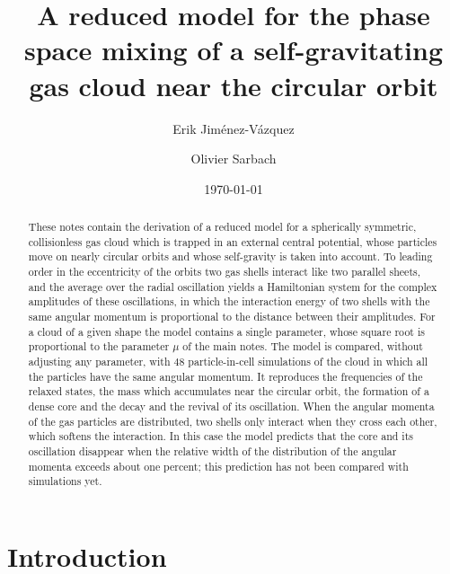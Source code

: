 \documentclass[prd,aps,nofootinbib,superscriptaddress,amsmath,amssymb]{revtex4}
\newcommand{\EJ}[1]{{\color{red}~\textsf{[(Erik) #1]}}}
\begin{document}


\title{A reduced model for the phase space mixing of a self-gravitating gas cloud near the circular orbit}

\author{Erik Jim\'enez-V\'azquez}
\affiliation{\EJ{Affiliation to be completed.}}

\author{Olivier Sarbach}


\begin{abstract}
These notes contain the derivation of a reduced model for a spherically symmetric, collisionless gas cloud which is trapped in an external central potential, whose particles move on nearly circular orbits and whose self-gravity is taken into account. To leading order in the eccentricity of the orbits two gas shells interact like two parallel sheets, and the average over the radial oscillation yields a Hamiltonian system for the complex amplitudes of these oscillations, in which the interaction energy of two shells with the same angular momentum is proportional to the distance between their amplitudes. For a cloud of a given shape the model contains a single parameter, whose square root is proportional to the parameter $\mu$ of the main notes. The model is compared, without adjusting any parameter, with $48$ particle-in-cell simulations of the cloud in which all the particles have the same angular momentum. It reproduces the frequencies of the relaxed states, the mass which accumulates near the circular orbit, the formation of a dense core and the decay and the revival of its oscillation. When the angular momenta of the gas particles are distributed, two shells only interact when they cross each other, which softens the interaction. In this case the model predicts that the core and its oscillation disappear when the relative width of the distribution of the angular momenta exceeds about one percent; this prediction has not been compared with simulations yet.
\end{abstract}

\date{\today}

\maketitle


\section{Introduction}
\label{Sec:Intro}
\end{document}
